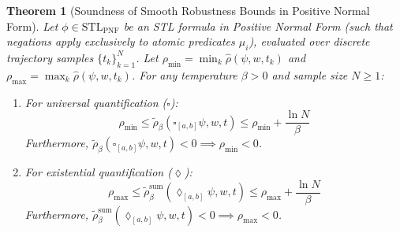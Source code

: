 \documentclass[journal]{IEEEtran}
\newtheorem{theorem}{Theorem}
\begin{document}
\begin{theorem}[Soundness of Smooth Robustness Bounds in Positive Normal Form]
\label{thm:smooth_soundness}
Let $\phi \in \text{STL}_{\text{PNF}}$ be an STL formula in Positive Normal Form (such that negations apply exclusively to atomic predicates $\mu_i$), evaluated over discrete trajectory samples $\{t_k\}_{k=1}^N$. Let $\rho_{\min} = \min_{k} \hat{\rho}(\psi, w, t_k)$ and $\rho_{\max} = \max_{k} \hat{\rho}(\psi, w, t_k)$. For any temperature $\beta > 0$ and sample size $N \ge 1$:
\begin{enumerate}
    \item For universal quantification ($\square$):
    \begin{equation}
    \label{eq:universal_bound}
    \rho_{\min} \le \tilde{\rho}_\beta(\square_{[a,b]} \psi, w, t) \le \rho_{\min} + \frac{\ln N}{\beta}
    \end{equation}
    Furthermore, $\tilde{\rho}_\beta(\square_{[a,b]} \psi, w, t) < 0 \implies \rho_{\min} < 0$.
    \item For existential quantification ($\lozenge$):
    \begin{equation}
    \label{eq:existential_bound}
    \rho_{\max} \le \tilde{\rho}_\beta^{\text{sum}}(\lozenge_{[a,b]} \psi, w, t) \le \rho_{\max} + \frac{\ln N}{\beta}
    \end{equation}
    Furthermore, $\tilde{\rho}_\beta^{\text{sum}}(\lozenge_{[a,b]} \psi, w, t) < 0 \implies \rho_{\max} < 0$.
\end{enumerate}
\end{theorem}
\end{document}
